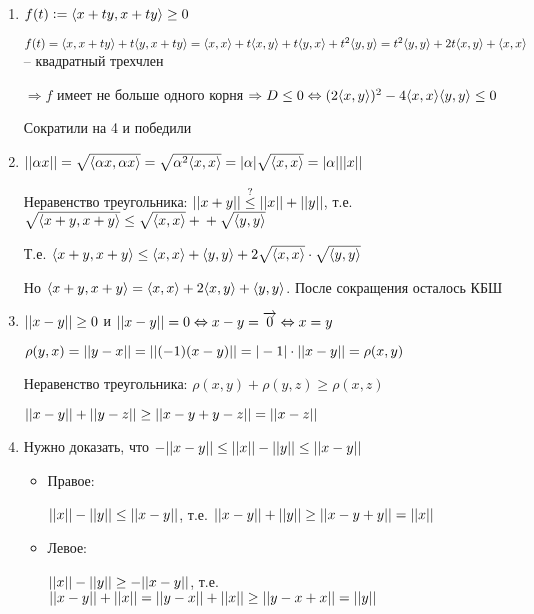 \documentclass[12pt]{article}
\begin{document}
\begin{enumerate}
    \item $f(t) := \langle x + ty, x + ty \rangle \geq 0$
    
    $f(t) = \langle x, x + ty \rangle + t\langle y, x + ty \rangle = \langle x, x \rangle + t\langle x, y \rangle + t\langle y, x \rangle + t^2\langle y, y \rangle = t^2\langle y, y \rangle + 2t\langle x, y \rangle + \langle x, x \rangle$ -- квадратный трехчлен

    $\Rightarrow f$ имеет не больше одного корня $\Rightarrow D \leq 0 \Leftrightarrow (2\langle x, y \rangle)^2 - 4\langle x, x \rangle\langle y, y \rangle \leq 0$

    Сократили на 4 и победили

    \item $|| \alpha x || = \sqrt{\langle \alpha x, \alpha x \rangle} = \sqrt{\alpha^2\langle x, x \rangle} = |\alpha|\sqrt{\langle x, x \rangle} = |\alpha||| x ||$
    
    Неравенство треугольника: $|| x + y || \stackrel{?}{\leq} || x || + || y ||$, т.е. $\sqrt{\langle x + y, x + y \rangle} \leq \sqrt{\langle x, x \rangle} + \\ + \sqrt{\langle y, y \rangle}$

    Т.е. $\langle x + y, x + y \rangle \leq \langle x, x \rangle + \langle y, y \rangle + 2\sqrt{\langle x,x \rangle} \cdot \sqrt{\langle y, y \rangle}$

    Но $\langle x + y, x + y \rangle = \langle x, x \rangle + 2\langle x, y \rangle + \langle y, y \rangle$. После сокращения осталось КБШ

    \item $|| x - y || \geq 0$ и $|| x - y || = 0 \Leftrightarrow x - y = \overrightarrow{0} \Leftrightarrow x = y$
    
    $\rho(y, x) = || y - x || = || (-1)(x - y) || = |-1| \cdot || x - y || = \rho(x, y)$

    Неравенство треугольника: $\rho(x, y) + \rho(y, z) \geq \rho(x, z)$

    $|| x - y || + || y - z || \geq || x - y + y - z || = || x - z ||$

    \item Нужно доказать, что $-|| x - y || \leq || x || - || y || \leq || x - y ||$
    
    \begin{itemize}
        \item Правое:
        
        $|| x || - || y || \leq || x - y ||$, т.е. $|| x - y || + || y || \geq || x - y + y || = || x ||$

        \item Левое:
        
        $|| x || - || y || \geq -|| x - y ||$, т.е. $|| x - y || + || x || = || y - x || + || x || \geq || y - x + x || = || y ||$
    \end{itemize}
\end{enumerate}
\end{document}
